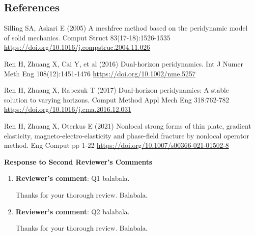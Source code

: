 \documentclass[11pt]{article}
\begin{document}
\subsection*{References}
\begin{enumerate}[label={[\arabic*]}]
      \item Silling SA, Askari E (2005) A meshfree method based on the peridynamic model of solid mechanics. Comput Struct 83(17-18):1526-1535 \url{https://doi.org/10.1016/j.compstruc.2004.11.026}
      \item Ren H, Zhuang X, Cai Y, et al (2016) Dual-horizon peridynamics. Int J Numer Meth Eng 108(12):1451-1476 \url{https://doi.org/10.1002/nme.5257}
      \item Ren H, Zhuang X, Rabczuk T (2017) Dual-horizon peridynamics: A stable solution to varying horizons. Comput Method Appl Mech Eng 318:762-782 \url{https://doi.org/10.1016/j.cma.2016.12.031}
      \item Ren H, Zhuang X, Oterkus E (2021) Nonlocal strong forms of thin plate, gradient elasticity, magneto-electro-elasticity and phase-field fracture by nonlocal operator method. Eng Comput pp 1-22 \url{https://doi.org/10.1007/s00366-021-01502-8}
\end{enumerate}

\clearpage
\vspace{0.5cm}
\begin{center}
      {\bf \large Response to Second Reviewer's Comments}
\end{center}

\begin{enumerate}
      \item {\bf Reviewer's comment}: { Q1 balabala.}

             Thanks for your thorough review. Balabala.


      \item {\bf Reviewer's comment}: { Q2 balabala.}

             Thanks for your thorough review. Balabala.


\end{enumerate}
\end{document}
